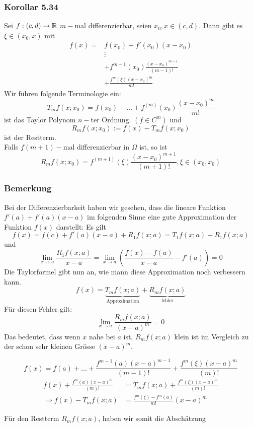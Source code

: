 \subsubsection*{Korollar 5.34}
Sei $f:(c,d)\to\mathbb{R}$ $m-$mal differenzierbar, seien $x_0,x\in (c,d)$. Dann gibt es $\xi\in (x_0,x)$ mit
\begin{align*}
f(x)=&f(x_0)+f'(x_0)(x-x_0)\\
&\vdots \\
&+f^{m-1}(x_0)\frac{(x-x_0)^{m-1}}{(m-1)!}\\
&+\frac{f^m(\xi)(x-x_0)^m}{m!}
\end{align*}
Wir führen folgende Terminologie ein:
\[T_mf(x;x_0) = f(x_0)+\dots+f^{(m)}(x_0)\frac{(x-x_0)^m}{m!}\]
ist das Taylor Polynom $n-$ter Ordnung. $\left( f\in C^m\right)$ und
\[R_mf(x;x_0):=f(x)-T_mf(x;x_0)\]
ist der Restterm. \\

Falls $f(m+1)-$mal differenzierbar in $\Omega$ ist, so ist
\[R_mf(x;x_0)=f^{(m+1)}(\xi)\frac{\left( x-x_0\right)^{m+1}}{(m+1)!}, \xi\in\left( x_0,x_0\right)\]

\subsubsection*{Bemerkung}
Bei der Differenzierbarkeit haben wir gesehen, dass die lineare Funktion $f'(a)+f'(a)(x-a)$ im folgenden Sinne eine gute Approximation der Funktion $f(x)$ darstellt: Es gilt
\[f(x)=f(c)+f'(a)(x-a)+R_1f(x;a) = T_1f(x;a)+R_1f(x;a)\]
und
\[\lim\limits_{x\to a}\frac{R_1f(x;a)}{x-a} = \lim\limits_{x\to a}\left(\frac{f(x)-f(a)}{x-a}-f'(a)\right)=0\]
Die Taylorformel gibt nun an, wie mann diese Approximation noch verbessern kann.
\[f(x) = \underbrace {{T_m}f(x;a)}_{{\text{Approximation}}} + \underbrace {{R_m}f(x;a)}_{{\text{fehler}}}\]
Für diesen Fehler gilt:
\[\lim\limits_{x\to a}\frac{R_mf(x;a)}{(x-a)^m}=0\tag{\textasteriskcentered}\]
Das bedeutet, dass wenn $x$ nahe bei $a$ ist, $R_mf(x;a)$ klein ist im Vergleich zu der schon sehr kleinen Grösse $(x-a)^m$. 

\[f(x) = f(a)+\dots+\frac{f^{m-1}(a)(x-a)^{m-1}}{(m-1)!}+\frac{f^{m}(\xi)(x-a)^{m}}{(m)!}\]
\begin{align*}
f(x) + \frac{f^{m}(a)(x-a)^{m}}{(m)!} &= T_m f(x;a)+\frac{f^{m}(\xi)(x-a)^{m}}{(m)!}\\
\Rightarrow f(x)-T_mf(x;a) &= \frac{f^m (\xi) -f^m(a)}{m!}(x-a)^m
\end{align*}

Für den Restterm $R_mf(x;a)$, haben wir somit die Abschätzung 

